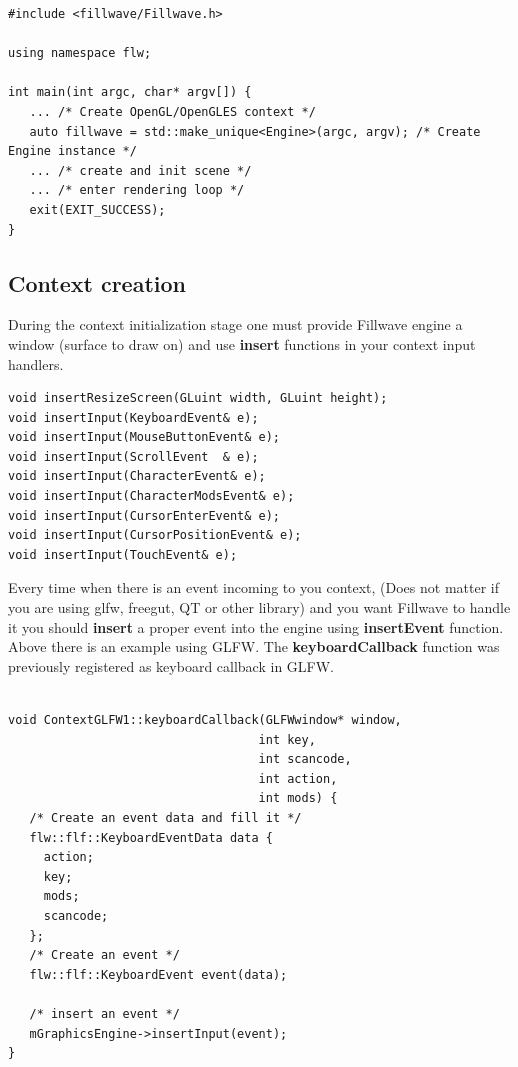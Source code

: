 \documentclass{article}
\begin{document}
\begin{lstlisting}
#include <fillwave/Fillwave.h>

using namespace flw;

int main(int argc, char* argv[]) {
   ... /* Create OpenGL/OpenGLES context */
   auto fillwave = std::make_unique<Engine>(argc, argv); /* Create Engine instance */
   ... /* create and init scene */
   ... /* enter rendering loop */
   exit(EXIT_SUCCESS);
}
\end{lstlisting}

\subsection{Context creation}\label{sec:Context}
\indent \indent During the context initialization stage one must provide Fillwave engine a window (surface to draw on) and use \textbf{insert} functions in your context input handlers.

\begin{lstlisting}
void insertResizeScreen(GLuint width, GLuint height);
void insertInput(KeyboardEvent& e);
void insertInput(MouseButtonEvent& e);
void insertInput(ScrollEvent  & e);
void insertInput(CharacterEvent& e);
void insertInput(CharacterModsEvent& e);
void insertInput(CursorEnterEvent& e);
void insertInput(CursorPositionEvent& e);
void insertInput(TouchEvent& e);
\end{lstlisting}

\indent \indent Every time when there is an event incoming to you context, (Does not matter if you are using glfw, freegut, QT or other library) and you want Fillwave to handle it you should \textbf{insert} a proper event into the engine using \textbf{insertEvent} function. Above there is an example using GLFW. The \textbf{keyboardCallback} function was previously registered as keyboard callback in GLFW.  

\begin{lstlisting}

void ContextGLFW1::keyboardCallback(GLFWwindow* window,
                                   int key,
                                   int scancode,
                                   int action,
                                   int mods) {
   /* Create an event data and fill it */
   flw::flf::KeyboardEventData data {
     action;
     key;
     mods;
     scancode;
   };
   /* Create an event */
   flw::flf::KeyboardEvent event(data);
   
   /* insert an event */
   mGraphicsEngine->insertInput(event);
}
\end{lstlisting}
\end{document}
